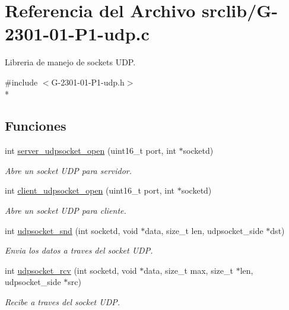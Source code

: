 \hypertarget{G-2301-01-P1-udp_8c}{}\section{Referencia del Archivo srclib/\+G-\/2301-\/01-\/\+P1-\/udp.c}
\label{G-2301-01-P1-udp_8c}


Libreria de manejo de sockets U\+D\+P.  


{\ttfamily \#include $<$G-\/2301-\/01-\/\+P1-\/udp.\+h$>$}\\*
\subsection*{Funciones}
\begin{DoxyCompactItemize}
\item 
int \hyperlink{G-2301-01-P1-udp_8c_a2e2c02bdf6bcf2f209668a8043bf6bd2}{server\+\_\+udpsocket\+\_\+open} (uint16\+\_\+t port, int $\ast$socketd)
\begin{DoxyCompactList}\small\item\em Abre un socket U\+D\+P para servidor. \end{DoxyCompactList}\item 
int \hyperlink{G-2301-01-P1-udp_8c_ae7f255a6718aa72c2e989f67141d3b04}{client\+\_\+udpsocket\+\_\+open} (uint16\+\_\+t port, int $\ast$socketd)
\begin{DoxyCompactList}\small\item\em Abre un socket U\+D\+P para cliente. \end{DoxyCompactList}\item 
int \hyperlink{G-2301-01-P1-udp_8c_aa3986001dc3af37c0ef0b456a1fcbb15}{udpsocket\+\_\+snd} (int socketd, void $\ast$data, size\+\_\+t len, udpsocket\+\_\+side $\ast$dst)
\begin{DoxyCompactList}\small\item\em Envia los datos a traves del socket U\+D\+P. \end{DoxyCompactList}\item 
int \hyperlink{G-2301-01-P1-udp_8c_a3c19ed0babf0c0e6d734440552fef2bd}{udpsocket\+\_\+rcv} (int socketd, void $\ast$data, size\+\_\+t max, size\+\_\+t $\ast$len, udpsocket\+\_\+side $\ast$src)
\begin{DoxyCompactList}\small\item\em Recibe a traves del socket U\+D\+P. \end{DoxyCompactList}\end{DoxyCompactItemize}


